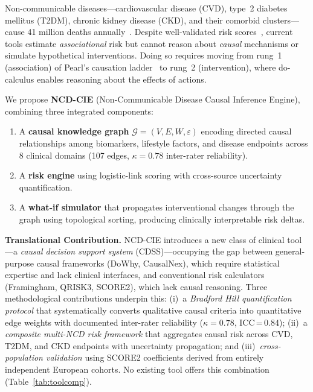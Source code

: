 \documentclass[runningheads]{llncs}
\begin{document}
Non-communicable diseases---cardiovascular disease (CVD), type~2
diabetes mellitus (T2DM), chronic kidney disease (CKD), and their
comorbid clusters---cause 41 million deaths
annually~\cite{who2021ncd}.
Despite well-validated risk scores~\cite{dagostino2008,hippisley2017qrisk3,score22021},
current tools estimate \emph{associational} risk but cannot reason about
\emph{causal} mechanisms or simulate hypothetical interventions.
Doing so requires moving from rung~1 (association) of Pearl's
causation ladder~\cite{pearl2018book} to rung~2 (intervention),
where do-calculus enables reasoning about the effects of actions.

We propose \textbf{NCD-CIE} (Non-Communicable Disease Causal Inference
Engine), combining three integrated components:
\begin{enumerate}
\item A \textbf{causal knowledge graph} $\mathcal{G}=(V,E,W,\varepsilon)$
  encoding directed causal relationships among biomarkers, lifestyle
  factors, and disease endpoints across 8 clinical domains
  (107 edges, $\kappa=0.78$ inter-rater reliability).
\item A \textbf{risk engine} using logistic-link scoring with
  cross-source uncertainty quantification.
\item A \textbf{what-if simulator} that propagates
  interventional changes through the graph using topological sorting,
  producing clinically interpretable risk deltas.
\end{enumerate}

\noindent\textbf{Translational Contribution.}
NCD-CIE introduces a new class of clinical tool---a \emph{causal
decision support system} (CDSS)---occupying the gap between
general-purpose causal frameworks (DoWhy, CausalNex), which require
statistical expertise and lack clinical interfaces, and
conventional risk calculators (Framingham, QRISK3, SCORE2), which
lack causal reasoning.
Three methodological contributions underpin this:
(i)~a \emph{Bradford Hill quantification protocol} that
systematically converts qualitative causal criteria into quantitative
edge weights with documented inter-rater reliability ($\kappa=0.78$,
ICC\,=\,0.84);
(ii)~a \emph{composite multi-NCD risk framework} that aggregates
causal risk across CVD, T2DM, and CKD endpoints with uncertainty
propagation; and
(iii)~\emph{cross-population validation} using SCORE2 coefficients
derived from entirely independent European cohorts.
No existing tool offers this combination (Table~\ref{tab:toolcomp}).
\end{document}
